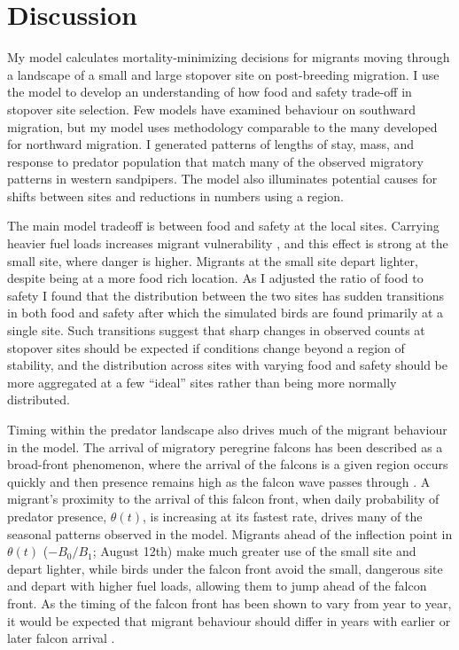 \section{Discussion}

My model calculates mortality-minimizing decisions for migrants moving through a landscape of a small and large stopover site on post-breeding migration. I use the model to develop an understanding of how food and safety trade-off in stopover site selection. Few models have examined behaviour on southward migration, but my model uses methodology comparable to the many developed for northward migration. I generated patterns of lengths of stay, mass, and response to predator population that match many of the observed migratory patterns in western sandpipers. The model also illuminates potential causes for shifts between sites and reductions in numbers using a region.

The main model tradeoff is between food and safety at the local sites. Carrying heavier fuel loads increases migrant vulnerability \citep{burns_effects_2002}, and this effect is strong at the small site, where danger is higher. Migrants at the small site depart lighter, despite being at a more food rich location. As I adjusted the ratio of food to safety I found that the distribution between the two sites has sudden transitions in both food and safety after which the simulated birds are found primarily at a single site. Such transitions suggest that sharp changes in observed counts at stopover sites should be expected if conditions change beyond a region of stability, and the distribution across sites with varying food and safety should be more aggregated at a few ``ideal'' sites rather than being more normally distributed.

Timing within the predator landscape also drives much of the migrant behaviour in the model. The arrival of migratory peregrine falcons has been described as a broad-front phenomenon, where the arrival of the falcons is a given region occurs quickly and then presence remains high as the falcon wave passes through \citep{Ydenberg2007b,Worcester2008,lank_effects_2003,Hope2011,Hope2014}. A migrant's proximity to the arrival of this falcon front, when daily probability of predator presence, $\theta(t)$, is increasing at its fastest rate, drives many of the seasonal patterns observed in the model. Migrants ahead of the inflection point in $\theta(t)$ ($-B_0/B_1$; August 12th) make much greater use of the small site and depart lighter, while birds under the falcon front avoid the small, dangerous site and depart with higher fuel loads, allowing them to jump ahead of the falcon front. As the timing of the falcon front has been shown to vary from year to year, it would be expected that migrant behaviour should differ in years with earlier or later falcon arrival \citep{Niehaus2006}.

